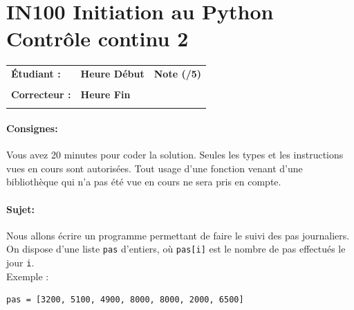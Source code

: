 \documentclass[a4paper,11pt]{article}
\begin{document}
\newpage

\section*{\center IN100 Initiation au Python\\
Contrôle continu 2}

\vspace{0.3 cm}

\begin{table}[h!]
\centering
\renewcommand{\arraystretch}{1.4} %
\begin{tabular}{|p{10cm}|p{3cm}|p{2cm}|}
\hline
\textbf{Étudiant :} & \textbf{Heure Début }  & \textbf{Note (/5) }  \\
& & \\
\hline
\textbf{Correcteur :} & \textbf{Heure Fin } & \\
& & \\
\hline

\hline
\end{tabular}
\end{table}
\vspace{-0.4 cm}
\paragraph*{Consignes:} Vous avez 20 minutes pour coder la solution. Seules les types et les instructions vues en cours sont autorisées. Tout usage d'une fonction 
venant d'une bibliothèque qui n'a pas été vue en cours ne sera pris en compte. 



\paragraph*{Sujet:}


Nous allons écrire un programme permettant de faire le suivi des pas journaliers. 
On dispose d'une liste \texttt{pas} d'entiers, o\`u \texttt{pas[i]} est le nombre de pas effectu\'es le jour \texttt{i}.\\
Exemple :
\begin{verbatim}
pas = [3200, 5100, 4900, 8000, 8000, 2000, 6500]
\end{verbatim}
\end{document}
